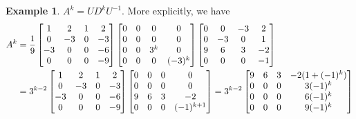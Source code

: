 \documentclass[reqno]{amsart}
\theoremstyle{definition}
\newtheorem{example}[theorem]{Example}
\begin{document}
\begin{example}
 $A^k=UD^kU^{-1}$.  More explicitly, we have
 \begin{align*}
  A^k &= 
   \frac{1}{9}
   \left[\begin{matrix} 1 &  2 & 1 &  2 \\
        0 & -3 & 0 & -3 \\
       -3 &  0 & 0 & -6 \\
        0 &  0 & 0 & -9 \end{matrix}\right]
   \left[\begin{matrix} 0 & 0 & 0 &  0 \\
        0 & 0 & 0 &  0 \\
        0 & 0 & 3^k &  0 \\
        0 & 0 & 0 & (-3)^k \end{matrix}\right]
   \left[\begin{matrix} 0 &  0 & -3 &  2 \\
        0 & -3 &  0 &  1 \\ 
        9 &  6 &  3 & -2 \\ 
        0 &  0 &  0 & -1 \end{matrix}\right] \\
   &= 
   3^{k-2}
   \left[\begin{matrix} 1 &  2 & 1 &  2 \\
        0 & -3 & 0 & -3 \\
       -3 &  0 & 0 & -6 \\
        0 &  0 & 0 & -9 \end{matrix}\right]
   \left[\begin{matrix} 0 &  0 &  0 &  0 \\
        0 &  0 &  0 &  0 \\ 
        9 &  6 &  3 & -2 \\ 
        0 &  0 &  0 & (-1)^{k+1} \end{matrix}\right] 
   = 
   3^{k-2}
   \left[\begin{matrix} 9 &  6 &  3 & -2(1+(-1)^k) \\
        0 &  0 &  0 & 3(-1)^k \\
        0 &  0 &  0 & 6(-1)^k \\
        0 &  0 &  0 & 9(-1)^k \end{matrix}\right]
 \end{align*}
\end{example}
\end{document}
